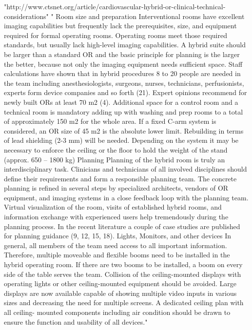 "http://www.ctsnet.org/article/cardiovascular-hybrid-or-clinical-technical-considerations"	
	"	Room size and preparation
	Interventional rooms have excellent imaging capabilities but frequently lack the prerequisites, size, and equipment required for formal operating rooms. Operating rooms meet those required standards, but usually lack high-level imaging capabilities. A hybrid suite should be larger than a standard OR and the basic principle for planning is the larger the better, because not only the imaging equipment needs sufficient space. Staff calculations have shown that in hybrid procedures 8 to 20 people are needed in the team including anesthesiologists, surgeons, nurses, technicians, perfusionists, experts form device companies and so forth (21). Expert opinions recommend for newly built ORs at least 70 m2 (4). Additional space for a control room and a technical room is mandatory adding up with washing and prep rooms to a total of approximately 150 m2 for the whole area. If a fixed C-arm system is considered, an OR size of 45 m2 is the absolute lower limit. Rebuilding in terms of lead shielding (2-3 mm) will be needed. Depending on the system it may be necessary to enforce the ceiling or the floor to hold the weight of the stand (approx. 650 – 1800 kg)
		Planning
	Planning of the hybrid room is truly an interdisciplinary task. Clinicians and technicians of all involved disciplines should define their requirements and form a responsible planning team. The concrete planning is refined in several steps by specialized architects, vendors of OR equipment, and imaging systems in a close feedback loop with the planning team. Virtual visualization of the room, visits of established hybrid rooms, and information exchange with experienced users help tremendously during the planning process. In the recent literature a couple of case studies are published for planning guidance (9, 12, 15, 18).
		Lights, Monitors, and other devices
	In general, all members of the team need access to all important information. Therefore, multiple moveable and flexible booms need to be installed in the hybrid operating room. If there are two booms to be installed, a boom on every side of the table serves the team. Collision of the ceiling-mounted displays with operating lights or other ceiling-mounted equipment should be avoided. Large displays are now available capable of showing multiple video inputs in various sizes and decreasing the need for multiple screens. A dedicated ceiling plan with all ceiling- mounted components including air condition should be drawn to ensure the function and usability of all devices."
	
